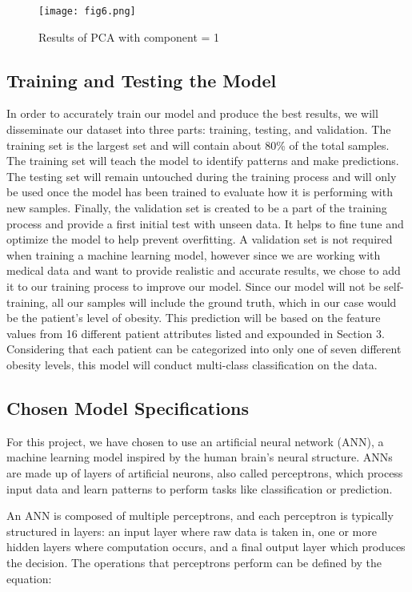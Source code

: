 \documentclass[conference]{IEEEtran}
\begin{document}
\begin{figure}[htbp]
\centering
\texttt{[image: fig6.png]}
\caption{Results of PCA with component = 1}
\label{Table 3.1}
\end{figure}

\subsection{Training and Testing the Model}
In order to accurately train our model and produce the best results, we will disseminate our dataset into three parts: training, testing, and validation. The training set is the largest set and will contain about 80\% of the total samples. The training set will teach the model to identify patterns and make predictions. The testing set will remain untouched during the training process and will only be used once the model has been trained to evaluate how it is performing with new samples. Finally, the validation set is created to be a part of the training process and provide a first initial test with unseen data. It helps to fine tune and optimize the model to help prevent overfitting. A validation set is not required when training a machine learning model, however since we are working with medical data and want to provide realistic and accurate results, we chose to add it to our training process to improve our model. Since our model will not be self-training, all our samples will include the ground truth, which in our case would be the patient’s level of obesity. This prediction will be based on the feature values from 16 different patient attributes listed and expounded in Section 3. Considering that each patient can be categorized into only one of seven different obesity levels, this model will conduct multi-class classification on the data.

\subsection{Chosen Model Specifications}\label{AA}

For this project, we have chosen to use an artificial neural network (ANN), a machine learning model inspired by the human brain’s neural structure. ANNs are made up of layers of artificial neurons, also called perceptrons, which process input data and learn patterns to perform tasks like classification or prediction.

An ANN is composed of multiple perceptrons, and each perceptron is typically structured in layers: an input layer where raw data is taken in, one or more hidden layers where computation occurs, and a final output layer which produces the decision. The operations that perceptrons perform can be defined by the equation:
\end{document}
